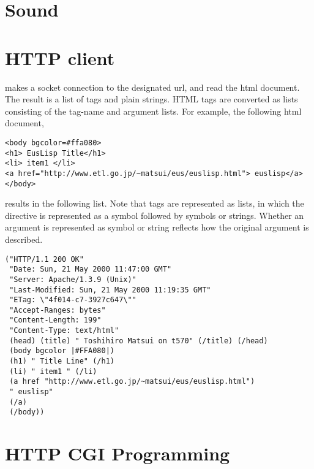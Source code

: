 


\section{Sound}

\section{HTTP client}



{makes a socket connection to the designated url, and
read the html document.
The result is a list of tags and plain strings.
HTML tags are converted as lists consisting of the tag-name
and argument lists.
For example, the following html document,
\begin{verbatim}
<body bgcolor=#ffa080>
<h1> EusLisp Title</h1>
<li> item1 </li>
<a href="http://www.etl.go.jp/~matsui/eus/euslisp.html"> euslisp</a>
</body>
\end{verbatim}
results in the following list.
Note that tags are represented as lists, in which
the directive is represented as a symbol
followed by symbols or strings.
Whether an argument is represented as symbol or string
reflects how the original argument is described.

\begin{verbatim}
("HTTP/1.1 200 OK"
 "Date: Sun, 21 May 2000 11:47:00 GMT"
 "Server: Apache/1.3.9 (Unix)"
 "Last-Modified: Sun, 21 May 2000 11:19:35 GMT"
 "ETag: \"4f014-c7-3927c647\""
 "Accept-Ranges: bytes"
 "Content-Length: 199"
 "Content-Type: text/html"
 (head) (title) " Toshihiro Matsui on t570" (/title) (/head)
 (body bgcolor |#FFA080|)
 (h1) " Title Line" (/h1)
 (li) " item1 " (/li)
 (a href "http://www.etl.go.jp/~matsui/eus/euslisp.html")
 " euslisp"
 (/a)
 (/body))
\end{verbatim}



\section{HTTP CGI Programming}

}
